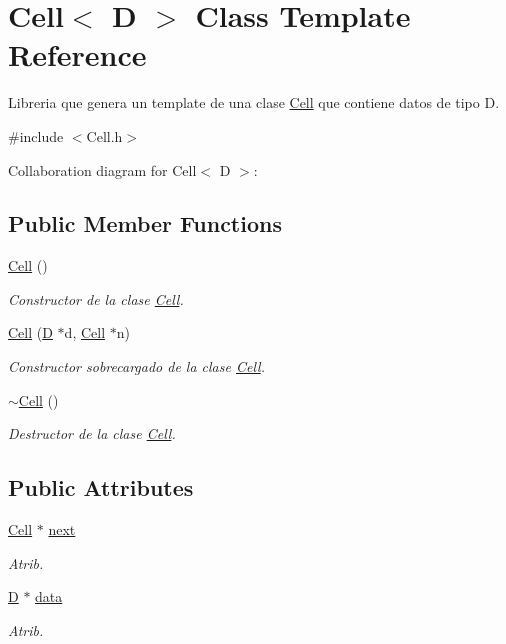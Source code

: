 \hypertarget{class_cell}{\section{Cell$<$ D $>$ Class Template Reference}
\label{class_cell}
}


Libreria que genera un template de una clase \hyperlink{class_cell}{Cell} que contiene datos de tipo D.  




{\ttfamily \#include $<$Cell.\+h$>$}



Collaboration diagram for Cell$<$ D $>$\+:
\subsection*{Public Member Functions}
\begin{DoxyCompactItemize}
\item 
\hyperlink{class_cell_a742a2adf7fa420fa9cbe386a87b5c79b}{Cell} ()
\begin{DoxyCompactList}\small\item\em Constructor de la clase \hyperlink{class_cell}{Cell}. \end{DoxyCompactList}\item 
\hyperlink{class_cell_addb102d2635522a2858eef6687407bcb}{Cell} (\hyperlink{gwp_2main_8cpp_af316c33cc298530f245e8b55330e86b5}{D} $\ast$d, \hyperlink{class_cell}{Cell} $\ast$n)
\begin{DoxyCompactList}\small\item\em Constructor sobrecargado de la clase \hyperlink{class_cell}{Cell}. \end{DoxyCompactList}\item 
\hyperlink{class_cell_a545129618ba41b218c6be7293975efda}{$\sim$\+Cell} ()
\begin{DoxyCompactList}\small\item\em Destructor de la clase \hyperlink{class_cell}{Cell}. \end{DoxyCompactList}\end{DoxyCompactItemize}
\subsection*{Public Attributes}
\begin{DoxyCompactItemize}
\item 
\hyperlink{class_cell}{Cell} $\ast$ \hyperlink{class_cell_a7e0e6c090f8aca70862c2dbc3257e3b9}{next}
\begin{DoxyCompactList}\small\item\em Atrib. \end{DoxyCompactList}\item 
\hyperlink{gwp_2main_8cpp_af316c33cc298530f245e8b55330e86b5}{D} $\ast$ \hyperlink{class_cell_ab8cc4d3059ef84a652eabc05b6c28f49}{data}
\begin{DoxyCompactList}\small\item\em Atrib. \end{DoxyCompactList}\end{DoxyCompactItemize}


